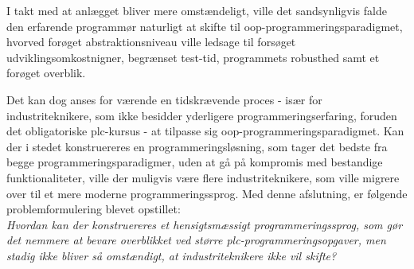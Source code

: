  I takt med at anlægget bliver mere omstændeligt, ville det sandsynligvis falde den erfarende programmør naturligt at skifte til \gls{oop}-programmeringsparadigmet, hvorved forøget abstraktionsniveau ville ledsage til forsøget udviklingsomkostnigner, begrænset test-tid, programmets robusthed samt et forøget overblik. 

Det kan dog anses for værende en tidskrævende proces - især for industriteknikere, som ikke besidder yderligere programmeringserfaring, foruden det obligatoriske \gls{plc}-kursus - at tilpasse sig \gls{oop}-programmeringsparadigmet\cite{dislikes_oop}. 
Kan der i stedet konstruereres en programmeringsløsning, som tager det bedste fra begge programmeringsparadigmer, uden at gå på kompromis med bestandige funktionaliteter, ville der muligvis være flere industriteknikere, som ville migrere over til et mere moderne programmeringssprog. Med denne afslutning, er følgende problemformulering blevet opstillet: \\

\noindent\textit{Hvordan kan der konstruereres et hensigtsmæssigt programmeringssprog, som gør det nemmere at bevare overblikket ved større \gls{plc}-programmeringsopgaver, men stadig ikke bliver så omstændigt, at industriteknikere ikke vil skifte?}



